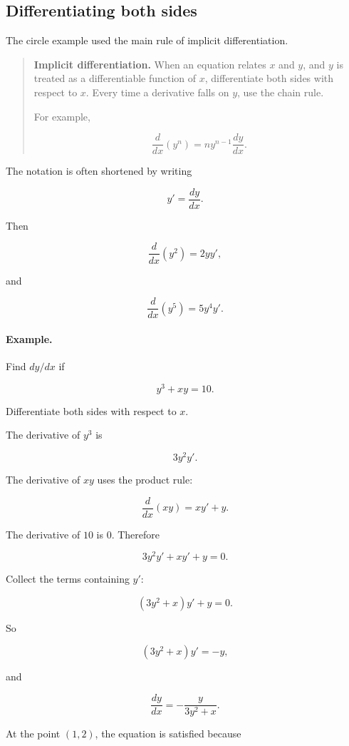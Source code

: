 \subsection{Differentiating both sides}
\label{subsec:differentiating-both-sides-implicit}

The circle example used the main rule of implicit differentiation.

\begin{quote}
\textbf{Implicit differentiation.}
When an equation relates \(x\) and \(y\), and \(y\) is treated as a differentiable function of \(x\), differentiate both sides with respect to \(x\).  Every time a derivative falls on \(y\), use the chain rule.

For example,

\[
\frac{d}{dx}(y^n)
=
ny^{n-1}\frac{dy}{dx}.
\]
\end{quote}

The notation is often shortened by writing

\[
y'=\frac{dy}{dx}.
\]

Then

\[
\frac{d}{dx}(y^2)=2yy',
\]

and

\[
\frac{d}{dx}(y^5)=5y^4y'.
\]

\paragraph{Example.}
Find \(dy/dx\) if

\[
y^3+xy=10.
\]

Differentiate both sides with respect to \(x\).

The derivative of \(y^3\) is

\[
3y^2y'.
\]

The derivative of \(xy\) uses the product rule:

\[
\frac{d}{dx}(xy)=x y'+y.
\]

The derivative of \(10\) is \(0\).  Therefore

\[
3y^2y'+xy'+y=0.
\]

Collect the terms containing \(y'\):

\[
(3y^2+x)y'+y=0.
\]

So

\[
(3y^2+x)y'=-y,
\]

and

\[
\boxed{
\frac{dy}{dx}
=
-\frac{y}{3y^2+x}.
}
\]

At the point \((1,2)\), the equation is satisfied because

